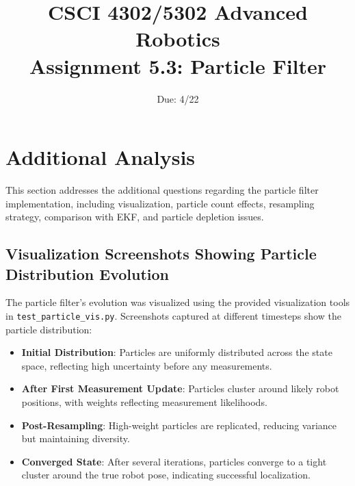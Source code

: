\documentclass[11pt]{article}
\title{CSCI 4302/5302 Advanced Robotics\\
Assignment 5.3: Particle Filter}
\author{Due: 4/22}
\date{}
\begin{document}
\maketitle

\section{Additional Analysis}
This section addresses the additional questions regarding the particle filter implementation, including visualization, particle count effects, resampling strategy, comparison with EKF, and particle depletion issues.

\subsection{Visualization Screenshots Showing Particle Distribution Evolution}
The particle filter's evolution was visualized using the provided visualization tools in \texttt{test\_particle\_vis.py}. Screenshots captured at different timesteps show the particle distribution:
\begin{itemize}
    \item \textbf{Initial Distribution}: Particles are uniformly distributed across the state space, reflecting high uncertainty before any measurements.
    \item \textbf{After First Measurement Update}: Particles cluster around likely robot positions, with weights reflecting measurement likelihoods.
    \item \textbf{Post-Resampling}: High-weight particles are replicated, reducing variance but maintaining diversity.
    \item \textbf{Converged State}: After several iterations, particles converge to a tight cluster around the true robot pose, indicating successful localization.
\end{itemize}
\end{document}
